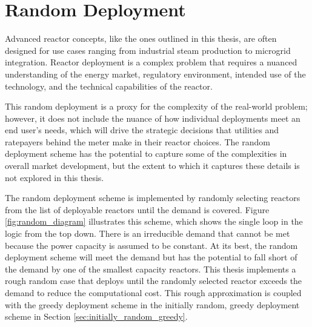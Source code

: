 \section{Random Deployment}
\label{sec:random_deployment}

Advanced reactor concepts, like the ones outlined in this thesis, are often
designed for use cases ranging from industrial steam production to microgrid
integration. Reactor deployment is a complex problem that requires a nuanced understanding of the energy market, regulatory environment, intended use of the technology, and the technical capabilities of the reactor.

This random deployment is a proxy for the complexity of the real-world problem; however, it does not include the nuance of how individual
deployments meet an end user's needs, which will drive the strategic decisions
that utilities and ratepayers behind the meter make in their reactor choices.
The random deployment scheme has the potential to capture some of the
complexities in overall market development, but the extent to which it captures these details is not explored in this thesis.

The random deployment scheme is implemented by randomly selecting reactors from the list of deployable reactors until the demand is covered. Figure \ref{fig:random_diagram} illustrates this scheme, which shows the single loop in the logic from the top down. There is an irreducible demand that cannot be met because the power capacity is assumed to be constant. At its best, the random deployment scheme will meet the demand but has the potential to fall short of the demand by one of the smallest capacity reactors. This thesis implements a rough random case that deploys until the randomly selected reactor exceeds the demand to reduce the computational cost. This rough approximation is coupled with the greedy deployment scheme in the initially random, greedy deployment scheme in Section \ref{sec:initially_random_greedy}.

